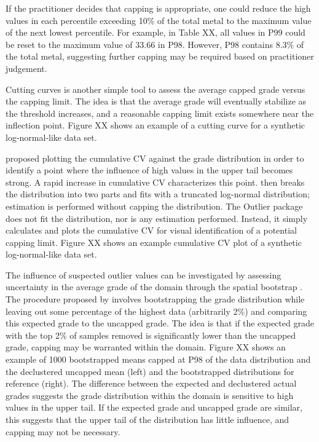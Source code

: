If the practitioner decides that capping is appropriate, one could reduce the high values in each percentile exceeding 10\% of the total metal to the maximum value of the next lowest percentile. For example, in Table XX, all values in P99 could be reset to the maximum value of 33.66 in P98. However, P98 contains 8.3\% of the total metal, suggesting further capping may be required based on practitioner judgement.

Cutting curves \citep{roscoe1996cutting,leuangthong2015dealing} is another simple tool to assess the average capped grade versus the capping limit. The idea is that the average grade will eventually stabilize as the threshold increases, and a reasonable capping limit exists somewhere near the inflection point. Figure XX shows an example of a cutting curve for a synthetic log-normal-like data set.

\cite{parker1991statistical} proposed plotting the cumulative \gls{CV} against the grade distribution in order to identify a point where the influence of high values in the upper tail becomes strong. A rapid increase in cumulative \gls{CV} characterizes this point. \cite{parker1991statistical} then breaks the distribution into two parts and fits with a truncated log-normal distribution; estimation is performed without capping the distribution. The Outlier package does not fit the distribution, nor is any estimation performed. Instead, it simply calculates and plots the cumulative \gls{CV} for visual identification of a potential capping limit. Figure XX shows an example cumulative \gls{CV} plot of a synthetic log-normal-like data set.

The influence of suspected outlier values can be investigated by assessing uncertainty in the average grade of the domain through the spatial bootstrap \citep{solow1985bootstrapping}. The procedure proposed by \cite{nowak2013suggestions} involves bootstrapping the grade distribution while leaving out some percentage of the highest data (arbitrarily 2\%) and comparing this expected grade to the uncapped grade. The idea is that if the expected grade with the top 2\% of samples removed is significantly lower than the uncapped grade, capping may be warranted within the domain. Figure XX shows an example of 1000 bootstrapped means capped at P98 of the data distribution and the declustered uncapped mean (left) and the bootstrapped distributions for reference (right). The difference between the expected and declustered actual grades suggests the grade distribution within the domain is sensitive to high values in the upper tail. If the expected grade and uncapped grade are similar, this suggests that the upper tail of the distribution has little influence, and capping may not be necessary.

